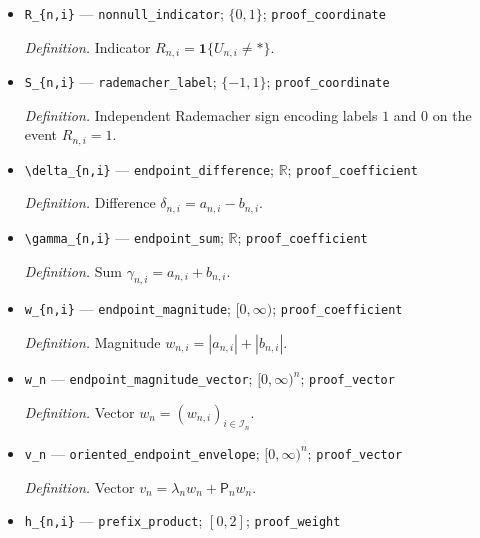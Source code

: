 \documentclass{article}
\begin{document}
\begin{itemize}
  \item \texttt{R\_\allowbreak{}\{n,\allowbreak{}i\}\allowbreak{}} --- \texttt{nonnull\_\allowbreak{}indicator}; \(\{0,1\}\); \texttt{proof\_\allowbreak{}coordinate}
  \par\smallskip\noindent\emph{Definition.} Indicator \(R_{n,i}=\mathbf 1\{U_{n,i}\ne *\}\).
  \item \texttt{S\_\allowbreak{}\{n,\allowbreak{}i\}\allowbreak{}} --- \texttt{rademacher\_\allowbreak{}label}; \(\{-1,1\}\); \texttt{proof\_\allowbreak{}coordinate}
  \par\smallskip\noindent\emph{Definition.} Independent Rademacher sign encoding labels \(1\) and \(0\) on the event \(R_{n,i}=1\).
  \item \texttt{\textbackslash{}\allowbreak{}delta\_\allowbreak{}\{n,\allowbreak{}i\}\allowbreak{}} --- \texttt{endpoint\_\allowbreak{}difference}; \(\mathbb R\); \texttt{proof\_\allowbreak{}coefficient}
  \par\smallskip\noindent\emph{Definition.} Difference \(\delta_{n,i}=a_{n,i}-b_{n,i}\).
  \item \texttt{\textbackslash{}\allowbreak{}gamma\_\allowbreak{}\{n,\allowbreak{}i\}\allowbreak{}} --- \texttt{endpoint\_\allowbreak{}sum}; \(\mathbb R\); \texttt{proof\_\allowbreak{}coefficient}
  \par\smallskip\noindent\emph{Definition.} Sum \(\gamma_{n,i}=a_{n,i}+b_{n,i}\).
  \item \texttt{w\_\allowbreak{}\{n,\allowbreak{}i\}\allowbreak{}} --- \texttt{endpoint\_\allowbreak{}magnitude}; \([0,\infty)\); \texttt{proof\_\allowbreak{}coefficient}
  \par\smallskip\noindent\emph{Definition.} Magnitude \(w_{n,i}=|a_{n,i}|+|b_{n,i}|\).
  \item \texttt{w\_\allowbreak{}n} --- \texttt{endpoint\_\allowbreak{}magnitude\_\allowbreak{}vector}; \([0,\infty)^n\); \texttt{proof\_\allowbreak{}vector}
  \par\smallskip\noindent\emph{Definition.} Vector \(w_n=(w_{n,i})_{i\in\mathcal I_n}\).
  \item \texttt{v\_\allowbreak{}n} --- \texttt{oriented\_\allowbreak{}endpoint\_\allowbreak{}envelope}; \([0,\infty)^n\); \texttt{proof\_\allowbreak{}vector}
  \par\smallskip\noindent\emph{Definition.} Vector \(v_n=\lambda_nw_n+\mathsf P_nw_n\).
  \item \texttt{h\_\allowbreak{}\{n,\allowbreak{}i\}\allowbreak{}} --- \texttt{prefix\_\allowbreak{}product}; \([0,2]\); \texttt{proof\_\allowbreak{}weight}

\end{itemize}
\end{document}
